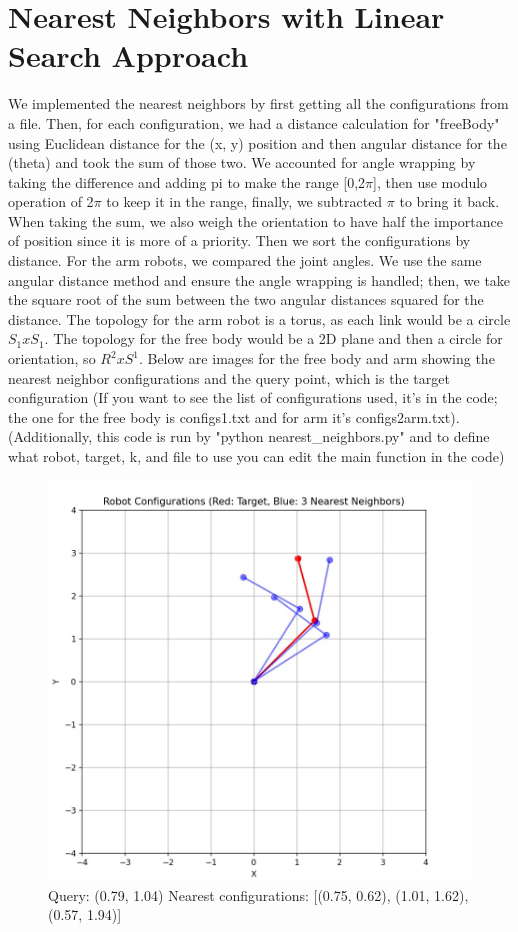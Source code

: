 \documentclass{article}
\begin{document}
\section{Nearest Neighbors with Linear Search Approach}

We implemented the nearest neighbors by first getting all the configurations from a file. Then, for each configuration, we had a distance calculation for "freeBody" using Euclidean distance for the (x, y) position and then angular distance for the (theta) and took the sum of those two. We accounted for angle wrapping by taking the difference and adding pi to make the range [0,2$\pi$], then use modulo operation of 2$\pi$ to keep it in the range, finally, we subtracted $\pi$ to bring it back. When taking the sum, we also weigh the orientation to have half the importance of position since it is more of a priority. Then we sort the configurations by distance. For the arm robots, we compared the joint angles. We use the same angular distance method and ensure the angle wrapping is handled; then, we take the square root of the sum between the two angular distances squared for the distance. The topology for the arm robot is a torus, as each link would be a circle $S_1 x S_1$. The topology for the free body would be a 2D plane and then a circle for orientation, so $R^2 x S^1$. Below are images for the free body and arm showing the nearest neighbor configurations and the query point, which is the target configuration (If you want to see the list of configurations used, it's in the code; the one for the free body is configs1.txt and for arm it's configs2arm.txt). (Additionally, this code is run by "python nearest\_neighbors.py" and to define what robot, target, k, and file to use you can edit the main function in the code)

\begin{figure} [H]
    \centering
    \includegraphics[width=0.5\linewidth]{latex_media/nearestArm1.jpg}
    \caption{Query: (0.79, 1.04)
    Nearest configurations: [(0.75, 0.62), (1.01, 1.62), (0.57, 1.94)]}
\end{figure}
\end{document}
